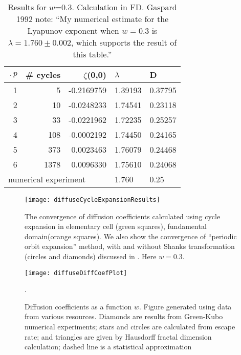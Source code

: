 

\begin{table}[htbp]
\hfill
{}
\begin{tabular}{|r|r|r|l|l|}
\hline
$\period{p}$ & \# cycles & $\zeta$(0,0) & $\lambda$ & D \\ \hline\hline
1      & 5      & -0.2169759 & 1.39193 & 0.37795 \\
2      & 10     & -0.0248233 & 1.74541 & 0.23118\\
3      & 33     & -0.0221962 & 1.72235 & 0.25257\\
4      & 108    & -0.0002192 & 1.74450 & 0.24165\\
5      & 373    &  0.0023463 & 1.76079 & 0.24468\\
6      & 1378   &  0.0096330 & 1.75610 & 0.24068\\ \hline\hline
\multicolumn{3}{|l|}{numerical experiment}
                           & 1.760 & 0.25
\\ \hline
\end{tabular}
\caption{\label{TCELL2}
  Results for $w$=0.3. Calculation in FD. Gaspard 1992
  note: ``My numerical estimate for the Lyapunov exponent when $w=0.3$ is
  $\lambda = 1.760 \pm 0.002$, which supports the result of this table.''
}
\end{table}

\begin{figure}[htbp]
  \texttt{[image: diffuseCycleExpansionResults]}
  \caption[]{\label{fig-convergence}
  The convergence of diffusion coefficients  calculated using cycle
  expansion in elementary cell (green squares),  fundamental
  domain(orange squares). We  also show the convergence of ``periodic
  orbit expansion'' method, with and  without Shanks transformation
  (circles and diamonds) discussed in  . Here $w = 0.3$.
  }
\end{figure}

\begin{figure}
\texttt{[image: diffuseDiffCoefPlot]}
  \caption[]{\label{fig-results} Diffusion coefficients as a function
  $w$.  Figure generated using data from various resources. Diamonds are
  results from  Green-Kubo numerical experiments;
  stars and  circles are calculated from escape
  rate; and triangles are  given by Hausdorff fractal dimension
  calculation; dashed line  is a statistical
  approximation}.
\end{figure}

